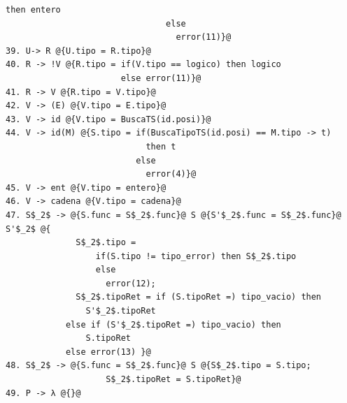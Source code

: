 \documentclass[a4paper, 12pt]{article}
\begin{document}
\begin{lstlisting}[style=EdT]
                                then entero
                                else
                                  error(11)}@
39. U-> R @{U.tipo = R.tipo}@
40. R -> !V @{R.tipo = if(V.tipo == logico) then logico
                       else error(11)}@
41. R -> V @{R.tipo = V.tipo}@
42. V -> (E) @{V.tipo = E.tipo}@
43. V -> id @{V.tipo = BuscaTS(id.posi)}@
44. V -> id(M) @{S.tipo = if(BuscaTipoTS(id.posi) == M.tipo -> t)
                            then t
                          else
                            error(4)}@
45. V -> ent @{V.tipo = entero}@
46. V -> cadena @{V.tipo = cadena}@
47. S$_2$ -> @{S.func = S$_2$.func}@ S @{S'$_2$.func = S$_2$.func}@ S'$_2$ @{
              S$_2$.tipo =
                  if(S.tipo != tipo_error) then S$_2$.tipo
                  else
                    error(12);
              S$_2$.tipoRet = if (S.tipoRet =) tipo_vacio) then 
				S'$_2$.tipoRet
			else if (S'$_2$.tipoRet =) tipo_vacio) then
				S.tipoRet
			else error(13) }@
48. S$_2$ -> @{S.func = S$_2$.func}@ S @{S$_2$.tipo = S.tipo; 
					S$_2$.tipoRet = S.tipoRet}@
49. P -> λ @{}@
\end{lstlisting}
\newpage
\end{document}
